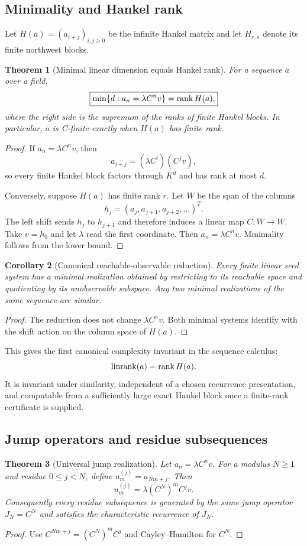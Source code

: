 \documentclass[11pt]{article}
\newtheorem{theorem}{Theorem}[section]\newtheorem{proposition}[theorem]{Proposition}\newtheorem{lemma}[theorem]{Lemma}\newtheorem{corollary}[theorem]{Corollary}
\theoremstyle{definition}\newtheorem{definition}[theorem]{Definition}\newtheorem{example}[theorem]{Example}\newtheorem{construction}[theorem]{Construction}\newtheorem{algorithm}[theorem]{Algorithm}\newtheorem{conjecture}[theorem]{Conjecture}\newtheorem{problem}[theorem]{Problem}
\theoremstyle{remark}\newtheorem{remark}[theorem]{Remark}\newtheorem{boundary}[theorem]{Boundary}\newtheorem{certificate}[theorem]{Computational Certificate}\newtheorem{classical}[theorem]{Classical Input}\newtheorem{principle}[theorem]{Structural Principle}
\begin{document}
\subsection{Minimality and Hankel rank}
Let $H(a)=(a_{i+j})_{i,j\geq0}$ be the infinite Hankel matrix and let $H_{r,s}$ denote its finite northwest blocks.

\begin{theorem}[Minimal linear dimension equals Hankel rank]
For a sequence $a$ over a field,
\[
 \boxed{\min\{d:a_n=\lambda C^nv\}=\operatorname{rank} H(a),}
\]
where the right side is the supremum of the ranks of finite Hankel blocks.  In particular, $a$ is C-finite exactly when $H(a)$ has finite rank.
\end{theorem}
\begin{proof}
If $a_n=\lambda C^nv$, then
\[
 a_{i+j}=(\lambda C^i)(C^jv),
\]
so every finite Hankel block factors through $K^d$ and has rank at most $d$.

Conversely, suppose $H(a)$ has finite rank $r$.  Let $W$ be the span of the columns
\[
 h_j=(a_j,a_{j+1},a_{j+2},\ldots)^T.
\]
The left shift sends $h_j$ to $h_{j+1}$ and therefore induces a linear map $C:W\to W$.  Take $v=h_0$ and let $\lambda$ read the first coordinate.  Then $a_n=\lambda C^nv$.  Minimality follows from the lower bound.
\end{proof}

\begin{corollary}[Canonical reachable-observable reduction]
Every finite linear seed system has a minimal realization obtained by restricting to its reachable space and quotienting by its unobservable subspace.  Any two minimal realizations of the same sequence are similar.
\end{corollary}
\begin{proof}
The reduction does not change $\lambda C^nv$.  Both minimal systems identify with the shift action on the column space of $H(a)$.
\end{proof}

This gives the first canonical complexity invariant in the sequence calculus:
\[
 \operatorname{linrank}(a)=\operatorname{rank} H(a).
\]
It is invariant under similarity, independent of a chosen recurrence presentation, and computable from a sufficiently large exact Hankel block once a finite-rank certificate is supplied.

\subsection{Jump operators and residue subsequences}
\begin{theorem}[Universal jump realization]
Let $a_n=\lambda C^nv$.  For a modulus $N\geq1$ and residue $0\leq j<N$, define $u_m^{(j)}=a_{Nm+j}$.  Then
\[
 \boxed{u_m^{(j)}=\lambda (C^N)^m C^jv.}
\]
Consequently every residue subsequence is generated by the same jump operator $J_N=C^N$ and satisfies the characteristic recurrence of $J_N$.
\end{theorem}
\begin{proof}
Use $C^{Nm+j}=(C^N)^mC^j$ and Cayley--Hamilton for $C^N$.
\end{proof}
\end{document}
